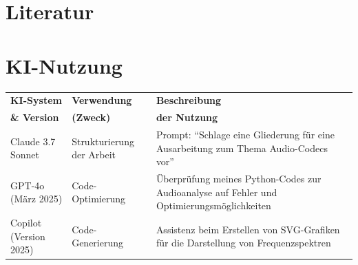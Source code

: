 \documentclass[11pt,        %
  english,ngerman,          %
  paper=a4,                 %
  captions=tablesignature,  %
  listof=numbered,          %
  bibliography=totoc,       %
  headings=small,           %
  headinclude=false,        %
  footinclude=false,        %
  parskip=half-,            %
  oneside,                  %
  BCOR=15mm,                 %
  DIV=12                    %
  ]{scrbook}                %
\begin{document}
\chapter{Literatur}

\nocite{cooper_ea-2014-about_face_4}

\renewcommand{\bibname}{Literatur}





\chapter{KI-Nutzung}\label{sec:ai_use}

  \begin{tabular}{
    >{\small\raggedright\arraybackslash}p{}
    >{\small\raggedright\arraybackslash}p{}
    >{\small\raggedright\arraybackslash}p{}
  }
  \textbf{KI-System}  & \textbf{Verwendung} & \textbf{Beschreibung} \\
  \textbf{\& Version} & \textbf{(Zweck)}    & \textbf{der Nutzung}  \\
  \hline
    Claude 3.7 Sonnet  & 
    Strukturierung der Arbeit & 
    Prompt: ``Schlage eine Gliederung für eine Ausarbeitung zum Thema Audio-Codecs vor'' \\
    GPT-4o (März 2025) &
    Code-Optimierung & 
    Überprüfung meines Python-Codes zur Audioanalyse auf Fehler und Optimierungsmöglichkeiten \\
    Copilot (Version 2025) &
    Code-Generierung &
    Assistenz beim Erstellen von SVG-Grafiken für die Darstellung von Frequenzspektren \\
\end{tabular}

\end{document}
